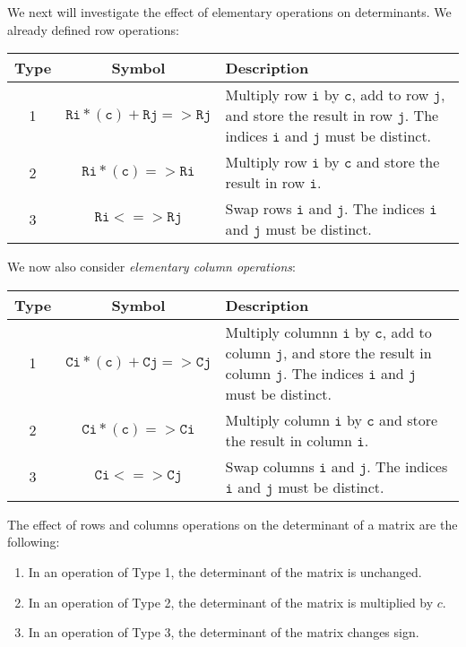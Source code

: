 \documentclass[12pt]{article}
\begin{document}
We next will investigate the effect of elementary operations on determinants. We already defined row operations:

\begin{center}
\begingroup
\renewcommand*{\arraystretch}{1.5}
\begin{tabular}{|c|c|p{3.5in}|}\hline
\textbf{Type} & \textbf{Symbol} & \textbf{\hfill Description\hfill\hfill}\\\hline
1 & $\mathtt{Ri*(c)+Rj=>Rj}$ & Multiply row $\mathtt{i}$ by $\mathtt{c}$, add to row $\mathtt{j}$, and store the result in row $\mathtt{j}$. The indices $\mathtt{i}$ and $\mathtt{j}$ must be distinct.\\\hline
2 & $\mathtt{Ri*(c)=>Ri}$ & Multiply row $\mathtt{i}$ by $\mathtt{c}$ and store the result in row $\mathtt{i}$.\\\hline
3 & $\mathtt{Ri<=>Rj}$ & Swap rows $\mathtt{i}$ and $\mathtt{j}$. The indices $\mathtt{i}$ and $\mathtt{j}$ must be distinct.\\\hline
\end{tabular}
\endgroup
\end{center}

We now also consider \emph{elementary column operations}:

\begin{center}
\begingroup
\renewcommand*{\arraystretch}{1.5}
\begin{tabular}{|c|c|p{3.5in}|}\hline
\textbf{Type} & \textbf{Symbol} & \textbf{\hfill Description\hfill\hfill}\\\hline
1 & $\mathtt{Ci*(c)+Cj=>Cj}$ & Multiply columnn $\mathtt{i}$ by $\mathtt{c}$, add to column $\mathtt{j}$, and store the result in column $\mathtt{j}$. The indices $\mathtt{i}$ and $\mathtt{j}$ must be distinct.\\\hline
2 & $\mathtt{Ci*(c)=>Ci}$ & Multiply column $\mathtt{i}$ by $\mathtt{c}$ and store the result in column $\mathtt{i}$. \\\hline
3 & $\mathtt{Ci<=>Cj}$ & Swap columns $\mathtt{i}$ and $\mathtt{j}$. The indices $\mathtt{i}$ and $\mathtt{j}$ must be distinct.\\\hline
\end{tabular}
\endgroup
\end{center}

The effect of rows and columns operations on the determinant of a matrix are the following:

\begin{enumerate}
\item In an operation of Type 1, the determinant of the matrix is unchanged.
\item In an operation of Type 2, the determinant of the matrix is multiplied by $c$.
\item In an operation of Type 3, the determinant of the matrix changes sign.
\end{enumerate}
\end{document}
